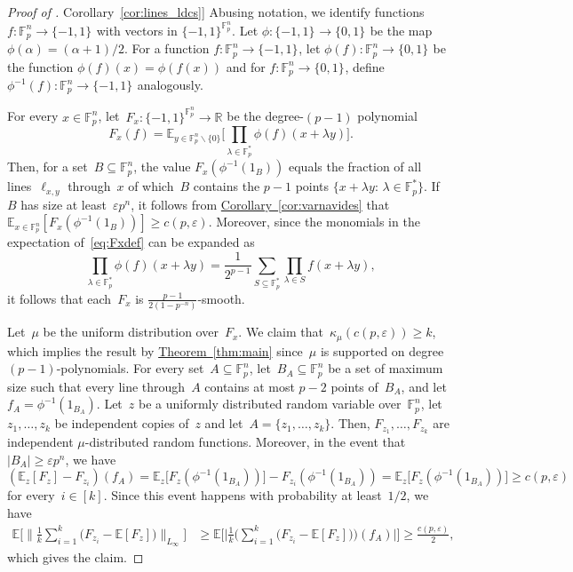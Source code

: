 \documentclass[11pt]{article}
\numberwithin{equation}{section}
\theoremstyle{definition}
\theoremstyle{plain}
\newcommand{\R}{\mathbb R}
\newcommand{\expref}[2]{\hyperref[#2]{#1~\ref{#2}}}
\newcommand{\bset}[1]{\{0,1\}^{#1}} %
\newcommand{\pmset}[1]{\{-1,1\}^{#1}} %
\newcommand{\Exp}{{\mathbb{E}}}
\newcommand{\st}{:\,} %
\newcommand{\eps}{\varepsilon}
\newcommand{\F}{{\mathbb{F}}}
\newcommand{\beq}{\begin{equation}}
\newcommand{\eeq}{\end{equation}}
\newcommand{\beqn}{\begin{equation*}}
\newcommand{\eeqn}{\end{equation*}}
\begin{document}
\begin{proof}[Proof of \expref{Corollary}{cor:lines_ldcs}]
  Abusing notation, we identify functions $f:\F_p^n\to\pmset{}$ with
  vectors in $\pmset{\F_p^n}$.  Let $\phi:\pmset{} \to\bset{}$ be the
  map $\phi(\alpha) = (\alpha+1)/2$.  For a function
  $f:\F_p^n\to\pmset{}$, let $\phi(f):\F_p^n\to\bset{}$ be the
  function $\phi(f)(x) = \phi(f(x))$ and for $f:\F_p^n\to\bset{}$,
  define $\phi^{-1}(f):\F_p^n\to\pmset{}$ analogously.

For every $x\in \F_p^n$, let~$F_{x}:\pmset{\F_p^n}\to\R$ be the degree-$(p-1)$ polynomial
\beq\label{eq:Fxdef}
F_x(f) = \Exp_{y\in\F_p^n\smallsetminus\{0\}}\Bigg[\prod_{\lambda\in\F_p^*}\phi(f)(x + \lambda y)\Bigg].
\eeq
Then, for a set~$B\subseteq\F_p^n$, the value $F_x(\phi^{-1}(1_B))$ equals the fraction of all 
 lines~$\ell_{x,y}$ %
  through~$x$ of which~$B$ contains the $p-1$ points $\{x + \lambda y\st \lambda\in \F_p^*\}$.
If~$B$ has size at least~$\eps p^n$, it follows from \expref{Corollary}{cor:varnavides} that 
$\Exp_{x\in\F_p^n}[F_x(\phi^{-1}(1_B))] \geq c(p,\eps)$.
Moreover, since the monomials in the expectation of~\eqref{eq:Fxdef}  can be expanded as
\beqn
\prod_{\lambda\in\F_p^*}\phi(f)(x + \lambda y)
=
\frac{1}{2^{p-1}}\sum_{S\subseteq \F_p^*}\prod_{\lambda\in S}f(x + \lambda y),
\eeqn
it follows that each~$F_x$ is $\frac{p-1}{2(1-p^{-n})}$-smooth.

Let~$\mu$ be the uniform distribution over~$F_x$.
We claim that~$\kappa_\mu(c(p,\eps)) \geq k$, which implies the result by \expref{Theorem}{thm:main} since~$\mu$ is supported on degree $(p-1)$-polynomials.
For every set~$A\subseteq \F_p^n$, let~$B_A\subseteq\F_p^n$ be a set of maximum size
such that
every  line %
through~$A$ contains at most $p-2$ points of~$B_A$,
and let~$f_A = \phi^{-1}(1_{B_A})$.
Let~$z$ be a uniformly distributed random variable over~$\F_p^n$, let  $z_1,\dots,z_k$ be independent copies of~$z$ and let~$A = \{z_1,\dots,z_k\}$.
Then, $F_{z_1},\dots,F_{z_k}$ are independent $\mu$-distributed random functions.
Moreover, in the event that $|B_A| \geq \eps p^n$, we have
\beqn
(\Exp_z[F_z]-F_{z_i})(f_A)
=
\Exp_z\big[F_z(\phi^{-1}(1_{B_A}))\big] - F_{z_i}(\phi^{-1}(1_{B_A}))
= \Exp_z\big[F_z(\phi^{-1}(1_{B_A}))\big]
 \geq c(p,\eps)
\eeqn
for every~$i\in[k]$.
Since this event happens with probability at least~$1/2$, we have
\begin{align*}
\Exp\Big[\Big\|\frac{1}{k}\sum_{i=1}^k\big(F_{z_i} - \Exp[F_{z}]\big)\Big\|_{L_\infty}\Big]
&\geq
\Exp\Big[\Big|\frac{1}{k}\Big(\sum_{i=1}^k\big(F_{z_i} - \Exp[F_{z}]\big)\Big)(f_A)\Big|\Big]
\geq
\frac{c(p,\eps)}{2},
\end{align*}
which gives the claim.
\end{proof}
\end{document}
